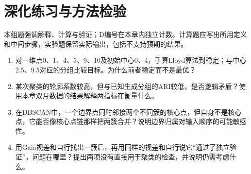 \section*{深化练习与方法检验}
本组题强调解释、计算与验证；D编号在本章内独立计数。计算题应写出所用定义和中间步骤，实验题保留实际输出，包括不支持预期的结果。
\begin{enumerate}[label=D\arabic*.]
\item 对一维点0、1、4、5、9、10及初始中心0、4，手算Lloyd算法到稳定；与中心2.5、9.5对应的分组比较目标。为什么前者稳定而不是最优？
\item 某次聚类的轮廓系数较高，但与已知生成分组的ARI较低，是否逻辑矛盾？使用本章双月数据的结果解释两指标在衡量什么。
\item 在DBSCAN中，一个边界点同时邻接两个不同簇的核心点，但自身不是核心点，它能否像核心点链那样把两簇合并？说明边界归属对输入顺序的可能敏感性。
\item 用Gaia视差和自行找出一簇后，再用同样的视差和自行说它“通过了独立验证”，问题在哪里？提出两项没有直接用于聚类的检查，并说明仍需考虑什么。
\end{enumerate}
